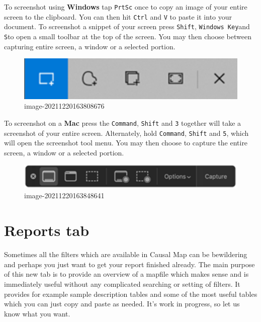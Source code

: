 \documentclass[
]{book}
\begin{document}
To screenshot using \textbf{Windows} tap \texttt{PrtSc} once to copy an image of your entire screen to the clipboard. You can then hit \texttt{Ctrl} and \texttt{V} to paste it into your document. To screenshot a snippet of your screen press \texttt{Shift}, \texttt{Windows\ Key}and \texttt{S}to open a small toolbar at the top of the screen. You may then choose between capturing entire screen, a window or a selected portion.

\begin{figure}
\centering
\includegraphics[width=6.77083in,height=\textheight]{_assets/image-20211220163808676.png}
\caption{image-20211220163808676}
\end{figure}

To screenshot on a \textbf{Mac} press the \texttt{Command}, \texttt{Shift} and \texttt{3} together will take a screenshot of your entire screen. Alternately, hold \texttt{Command}, \texttt{Shift} and \texttt{5}, which will open the screenshot tool menu. You may then choose to capture the entire screen, a window or a selected portion.

\begin{figure}
\centering
\includegraphics[width=6.77083in,height=\textheight]{_assets/image-20211220163848641.png}
\caption{image-20211220163848641}
\end{figure}

\hypertarget{xreports}{%
\chapter{Reports tab}\label{xreports}}

Sometimes all the filters which are available in Causal Map can be bewildering and perhaps you just want to get your report finished already. The main purpose of this new tab is to provide an overview of a mapfile which makes sense and is immediately useful without any complicated searching or setting of filters. It provides for example sample description tables and some of the most useful tables which you can just copy and paste as needed. It's work in progress, so let us know what you want.
\end{document}
